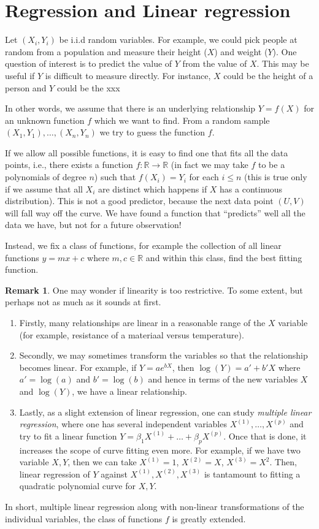 \documentclass[preprint,  11pt]{amsart}
\theoremstyle{plain} %
\theoremstyle{definition} %
\newtheorem{remark}[theorem]{Remark}
\begin{document}
\section{Regression and Linear regression}
Let $(X_{i},Y_{i})$ be i.i.d random variables. For example, we could pick people at random from a population and measure their height ($X$) and weight ($Y$). One question of interest is to predict the value of $Y$ from the value of $X$. This may be useful if $Y$ is difficult to measure directly. For instance, $X$ could be the height of a person and $Y$ could be the xxx

In other words, we assume that there is an underlying relationship $Y=f(X)$ for an unknown function $f$ which we want to find. From a random sample $(X_{1},Y_{1}),\ldots ,(X_{n},Y_{n})$  we try to guess the function $f$.

If we allow all possible functions, it is easy to find one that fits all the data points, i.e., there exists a function $f:\mathbb{R}\rightarrow \mathbb{R}$ (in fact we may take $f$ to be a polynomials of degree $n$) such that $f(X_{i})=Y_{i}$ for each $i\le n$ (this is true only if we assume that all $X_{i}$ are distinct which happens if $X$ has a continuous distribution). This is not a good predictor, because the next data point $(U,V)$ will fall way off the curve. We have found a function that ``predicts'' well all the data we have, but not for a future observation! 

Instead, we fix a class of functions, for example the collection of all linear functions $y=mx+c$ where $m,c\in \mathbb{R}$ and within this class, find the best fitting function. 

\begin{remark} One may wonder if linearity is too restrictive. To some extent, but perhaps not as much as it sounds at first.
\begin{enumerate}\setlength\itemsep{6pt}
\item Firstly, many relationships are linear in a reasonable range of the $X$ variable (for example, resistance of a materiaal versus temperature). 
\item Secondly, we may sometimes transform the variables so that the relationship becomes linear. For example, if $Y=ae^{bX}$, then $\log(Y)=a'+b'X$ where $a'=\log(a)$ and $b'=\log(b)$ and hence in terms of the new variables $X$ and $\log(Y)$, we have a linear relationship. 
\item Lastly, as a slight extension of linear regression,  one can study {\em multiple linear regression}, where one   has several independent variables $X^{(1)},\ldots, X^{(p)}$ and try to fit a linear  function $Y=\beta_{1}X^{(1)}+\ldots +\beta_{p}X^{(p)}$. Once that is done, it increases the scope of curve fitting even more. For example, if we have two variable $X,Y$, then we can take $X^{(1)}=1$, $X^{(2)}=X$, $X^{(3)}=X^{2}$. Then, linear regression of $Y$ against $X^{(1)},X^{(2)},X^{(3)}$ is tantamount to fitting a quadratic polynomial curve for $X,Y$. 
\end{enumerate}
In short, multiple linear regression along with non-linear transformations of the individual variables, the class of functions $f$ is greatly extended.
 \end{remark}
\end{document}
